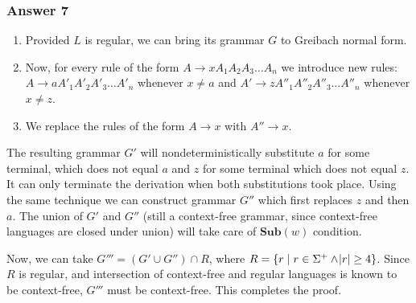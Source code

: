 \documentclass[11pt]{article}
\begin{document}
\subsubsection{Answer 7}
\label{sec-1-5-1}
\begin{enumerate}
\item Provided $L$ is regular, we can bring its grammar $G$ to Greibach normal
form.
\item Now, for every rule of the form $A \to xA_1A_2A_3\dots A_n$ we introduce
new rules: $A \to aA'_1A'_2A'_3\dots A'_n$ whenever $x \neq a$ and 
$A' \to zA''_1A''_2A''_3\dots A''_n$ whenever $x \neq z$.
\item We replace the rules of the form $A \to x$ with $A'' \to x$.
\end{enumerate}


The resulting grammar $G'$ will nondeterministically substitute $a$ for some
terminal, which does not equal $a$ and $z$ for some terminal which does not
equal $z$.  It can only terminate the derivation when both substitutions
took place.  Using the same technique we can construct grammar $G''$ which
first replaces $z$ and then $a$.  The union of $G'$ and $G''$ (still a
context-free grammar, since context-free languages are closed under union)
will take care of $\textbf{Sub}(w)$ condition.

Now, we can take $G''' = (G' \cup G'') \cap R$, where $R = \{r \;|\; r \in
    \Sigma^+ \land \abs{r} \geq 4\}$.  Since $R$ is regular, and intersection of
context-free and regular languages is known to be context-free, $G'''$ must
be context-free.  This completes the proof.
\end{document}
